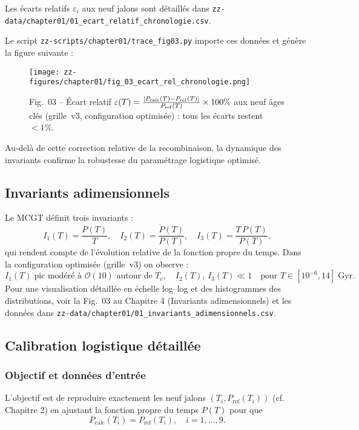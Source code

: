 Les écarts relatifs \(\varepsilon_i\) aux neuf jalons sont détaillés dans
\texttt{zz-data/chapter01/01\_ecart\_relatif\_chronologie.csv}.

Le script \texttt{zz-scripts/chapter01/trace\_fig03.py} importe ces données
et génère la figure suivante :

\begin{figure}[htbp]
  \centering
  \texttt{[image: zz-figures/chapter01/fig\_03\_ecart\_rel\_chronologie.png]}
  \caption{Fig.~03 – Écart relatif
    \(\varepsilon(T)
      =\frac{|P_{\rm calc}(T)-P_{\rm ref}(T)|}{P_{\rm ref}(T)}\times100\%\)
    aux neuf âges clés (grille~v3, configuration optimisée) : tous les écarts
    restent \(<1\%\).}
  \label{fig:ecart_relatif_chronologie}
\end{figure}

Au-delà de cette correction relative de la recombinaison, la dynamique des invariants confirme la robustesse du paramétrage logistique optimisé.

\subsection{Invariants adimensionnels}

Le MCGT définit trois invariants :
\[
  I_{1}(T)=\frac{P(T)}{T},\quad
  I_{2}(T)=\frac{\dot P(T)}{P(T)},\quad
  I_{3}(T)=\frac{T\,\dot P(T)}{P(T)},
\]
qui rendent compte de l’évolution relative de la fonction propre du temps.
Dans la configuration optimisée (grille~v3) on observe :
\[
  I_{1}(T)\;\text{pic modéré à }\mathcal{O}(10)\text{ autour de }T_{c},
  \quad
  I_{2}(T),\,I_{3}(T)\ll1
  \quad
  \text{pour }T\in[10^{-6},14]\;\mathrm{Gyr}.
\]
Pour une visualisation détaillée en échelle log–log et des histogrammes des distributions, voir la Fig.~03 au Chapitre 4 (Invariants adimensionnels) et les données dans
\texttt{zz-data/chapter01/01\_invariants_adimensionnels.csv}.

\subsection{Calibration logistique détaillée}

\subsubsection{Objectif et données d’entrée}

L’objectif est de reproduire exactement les neuf jalons
\((T_i,P_{\mathrm{ref}}(T_i))\) (cf. Chapitre 2) en ajustant la fonction propre
du temps \(P(T)\) pour que
\[
  P_{\mathrm{calc}}(T_{i}) = P_{\mathrm{ref}}(T_{i}),
  \quad i=1,\dots,9.
\]

